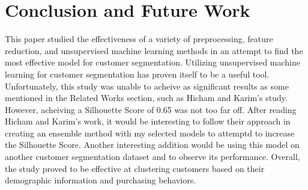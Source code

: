 \documentclass[twocolumn]{article}
\begin{document}
\section{Conclusion and Future Work}

This paper studied the effectiveness of a variety of preprocessing, feature reduction, and unsupervised machine learning methods in an attempt to find the most effective model for customer segmentation. Utilizing unsupervised machine learning for customer segmentation has proven itself to be a useful tool. Unfortunately, this study was unable to acheive as significant results as some mentioned in the Related Works section, such as Hicham and Karim's study.\cite{hicham} However, acheiving a Silhouette Score of 0.65 was not too far off. After reading Hicham and Karim's work, it would be interesting to follow their approach in creating an ensemble method with my selected models to attemptd to increase the Silhouette Score. Another interesting addition would be using this model on another customer segmentation dataset and to observe its performance. Overall, the study proved to be effective at clustering customers based on their demographic information and purchasing behaviors.


\twocolumn[
\begin{@twocolumnfalse}
\printbibliography
\end{@twocolumnfalse}
]
\end{document}
